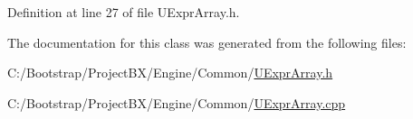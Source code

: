 Definition at line 27 of file UExprArray.h.

The documentation for this class was generated from the following files:\begin{CompactItemize}
\item 
C:/Bootstrap/ProjectBX/Engine/Common/\hyperlink{_u_expr_array_8h}{UExprArray.h}\item 
C:/Bootstrap/ProjectBX/Engine/Common/\hyperlink{_u_expr_array_8cpp}{UExprArray.cpp}\end{CompactItemize}
